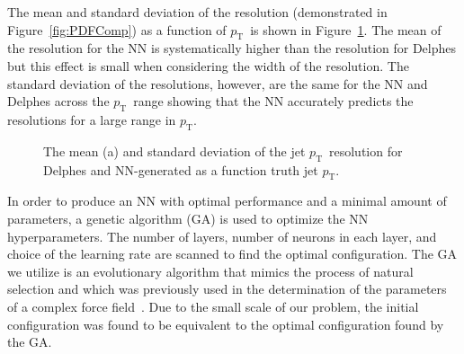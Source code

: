 \documentclass[showpacs,showkeys,preprint,prd,nofootinbib,linenumbers,12pt,superscriptaddress]{revtex4-1}
\def\pt{\ensuremath{p_{\mathrm{T}}}}
\begin{document}
The mean and standard deviation of the resolution (demonstrated in Figure~\ref{fig:PDFComp}) as a function of \pt\ is shown in Figure~\ref{fig:resVsPt}. The mean of the resolution for the NN is systematically higher than the resolution for Delphes but this effect is small when considering the width of the resolution. The standard deviation of the resolutions, however, are the same for the NN and Delphes across the \pt\ range showing that the NN accurately predicts the resolutions for a large range in \pt. 

\begin{figure}[htb]
  \caption{The mean (a) and standard deviation of the jet \pt\ resolution for Delphes and NN-generated as a function truth jet \pt.}
  \label{fig:resVsPt}
\end{figure}

In order to produce an NN with optimal performance and a minimal amount of parameters, a genetic algorithm (GA) is used to optimize the NN hyperparameters. The number of layers, number of neurons in each layer, and choice of the learning rate are scanned to find the optimal configuration. The GA we utilize is an evolutionary algorithm that mimics the process of natural selection and which was previously used in the determination of the parameters of a complex force field~\cite{doi:10.1021/acs.jctc.7b00521,doi:10.1021/acs.jctc.6b00432}. Due to the small scale of our problem, the initial configuration was found to be equivalent to the optimal configuration found by the GA.
\end{document}
